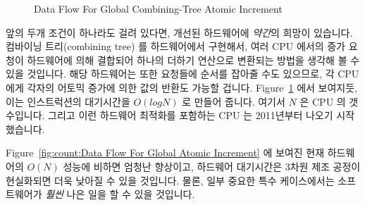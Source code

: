 {\begin{figure}[tb]
\begin{center}
\end{center}
\caption{Data Flow For Global Combining-Tree Atomic Increment}
\label{fig:count:Data Flow For Global Combining-Tree Atomic Increment}
\end{figure}

	앞의 두개 조건이 하나라도 걸려 있다면, 개선된 하드웨어에 \emph{약간}의
	희망이 있습니다.
	컴바이닝 트리(combining tree) 를 하드웨어에서 구현해서, 여러 CPU 에서의
	증가 요청이 하드웨어에 의해 결합되어 하나의 더하기 연산으로 변환되는
	방법을 생각해 볼 수 있을 것입니다.
	해당 하드웨어는 또한 요청들에 순서를 잡아줄 수도 있으므로, 각 CPU 에게
	각자의 어토믹 증가에 의한 값의 반환도 가능할 겁니다.
	Figure~\ref{fig:count:Data Flow For Global Combining-Tree Atomic Increment}
	에서 보여지듯, 이는 인스트럭션의 대기시간을 $O(log N)$ 로 만들어
	줍니다. 여기서 $N$ 은 CPU 의 갯수입니다.
	그리고 이런 하드웨어 최적화를 포함하는 CPU 는 2011년부터 나오기
	시작했습니다.

	Figure~\ref{fig:count:Data Flow For Global Atomic Increment} 에 보여진
	현재 하드웨어의  $O(N)$ 성능에 비하면 엄청난 향상이고, 하드웨어
	대기시간은 3차원 제조 공정이 현실화되면 더욱 낮아질 수 있을 것입니다.
	물론, 일부 중요한 특수 케이스에서는 소프트웨어가 \emph{훨씬} 나은 일을
	할 수 있을 것입니다.

} \QuickQuizEnd


